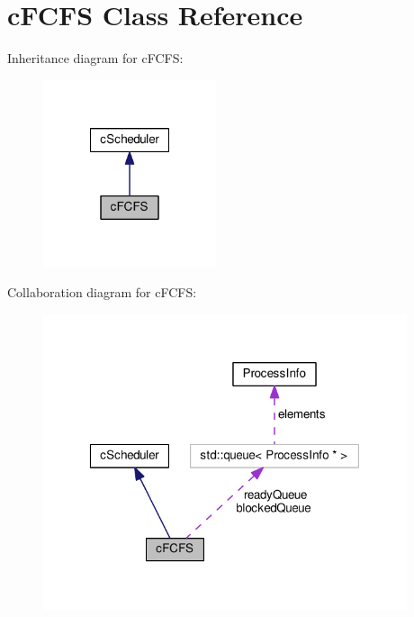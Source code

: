 \hypertarget{classcFCFS}{\section{c\-F\-C\-F\-S \-Class \-Reference}
\label{d6/dc3/classcFCFS}
}


\-Inheritance diagram for c\-F\-C\-F\-S\-:\nopagebreak
\begin{figure}[H]
\begin{center}
\leavevmode
\includegraphics[width=144pt]{d2/d94/classcFCFS__inherit__graph}
\end{center}
\end{figure}


\-Collaboration diagram for c\-F\-C\-F\-S\-:\nopagebreak
\begin{figure}[H]
\begin{center}
\leavevmode
\includegraphics[width=303pt]{d4/d8d/classcFCFS__coll__graph}
\end{center}
\end{figure}
